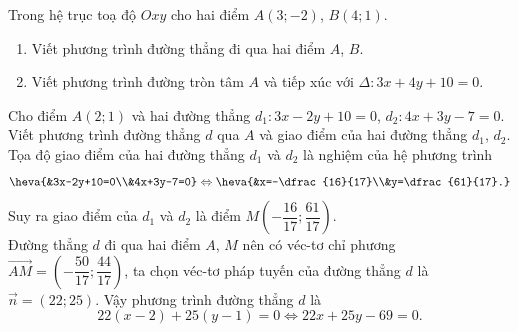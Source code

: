 \begin{bt}%
	Trong hệ trục toạ độ $Oxy$ cho hai điểm $A(3;-2)$, $B(4;1)$.
	\begin{enumerate}
		\item Viết phương trình đường thẳng đi qua hai điểm $A$, $B$.
		\item Viết phương trình đường tròn tâm $A$ và tiếp xúc với $\Delta\colon 3x+4y+10=0$.
	\end{enumerate}
\end{bt}

\begin{bt}%
	Cho điểm $A(2;1)$ và hai đường thẳng $d_1\colon 3x-2y+10=0$, $d_2\colon 4x+3y-7=0$. Viết phương trình đường thẳng $d$ qua $A$ và giao điểm của hai đường thẳng $d_1$, $d_2$.
	\loigiai
	{Tọa độ giao điểm của hai đường thẳng $d_1$ và $d_2$ là nghiệm của hệ phương trình
		$$\heva{&3x-2y+10=0\\&4x+3y-7=0} \Leftrightarrow \heva{&x=-\dfrac{16}{17}\\&y=\dfrac{61}{17}.}$$
		Suy ra giao điểm của $d_1$ và $d_2$ là điểm $M\left(-\dfrac{16}{17};\dfrac{61}{17}\right)$.\\
		Đường thẳng $d$ đi qua hai điểm $A$, $M$ nên có véc-tơ chỉ phương $\overrightarrow{AM}=\left(-\dfrac{50}{17};\dfrac{44}{17}\right)$, ta chọn véc-tơ pháp tuyến của đường thẳng $d$ là $\overrightarrow{n}=\left(22;25\right)$. Vậy phương trình đường thẳng $d$ là
		$$22(x-2)+25(y-1)=0 \Leftrightarrow 22x+25y-69=0.$$}
\end{bt}

